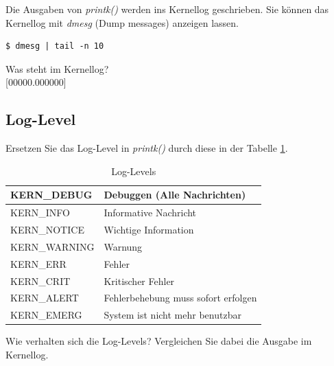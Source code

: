 Die Ausgaben von \emph{printk()} werden ins Kernellog geschrieben. Sie können das Kernellog mit \emph{dmesg} (Dump messages) anzeigen lassen.
\begin{lstlisting}
$ dmesg | tail -n 10
\end{lstlisting} \hfill

Was steht im Kernellog? \\

[00000.000000] \underline{\hspace{0.5\textwidth}} \newline
[00000.000000] \underline{\hspace{0.5\textwidth}} \newline
[00000.000000] \underline{\hspace{0.5\textwidth}} \newline
[00000.000000] \underline{\hspace{0.5\textwidth}} \newline
[00000.000000] \underline{\hspace{0.5\textwidth}} \newline
[00000.000000] \underline{\hspace{0.5\textwidth}} \newline
[00000.000000] \underline{\hspace{0.5\textwidth}} \newline
[00000.000000] \underline{\hspace{0.5\textwidth}} \newline
[00000.000000] \underline{\hspace{0.5\textwidth}} \newline
[00000.000000] \underline{\hspace{0.5\textwidth}} \newline

\subsection{Log-Level}

Ersetzen Sie das Log-Level in \emph{printk()} durch diese in der Tabelle \ref{tab:loglevel}.

\begin{table}[h!]
   \begin{center}
   \begin{tabular}{| l | l |} \hline
   KERN\_DEBUG   & Debuggen (Alle Nachrichten) \\ \hline
   KERN\_INFO    & Informative Nachricht \\ \hline
   KERN\_NOTICE  & Wichtige Information \\ \hline
   KERN\_WARNING & Warnung \\ \hline
   KERN\_ERR     & Fehler \\ \hline
   KERN\_CRIT    & Kritischer Fehler \\ \hline
   KERN\_ALERT   & Fehlerbehebung muss sofort erfolgen \\ \hline
   KERN\_EMERG   & System ist nicht mehr benutzbar \\ \hline
   \end{tabular}
   \caption{Log-Levels}
   \label{tab:loglevel}
   \end{center}
\end{table}


Wie verhalten sich die Log-Levels? Vergleichen Sie dabei die Ausgabe im Kernellog.

\underline{\hspace{\textwidth}}

